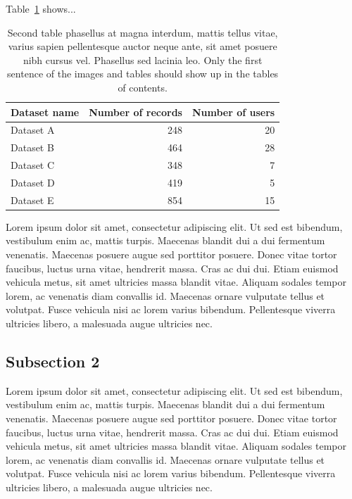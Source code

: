 Table~\ref{tab:table2} shows...


\begin{table}[ht]
\caption[Second table phasellus at magna interdum, mattis tellus vitae, varius sapien pellentesque auctor neque ante, sit amet posuere nibh cursus vel]
{Second table phasellus at magna interdum, mattis tellus vitae, varius sapien pellentesque auctor neque ante, sit amet posuere nibh cursus vel. Phasellus sed lacinia leo. Only the first sentence of the images and tables should show up in the tables of contents.}
\centering
\fontsize{10}{12}\selectfont
\begin{tabular}{|l|r|r|}
\hline
Dataset name & Number of records  & Number of users \\
\hline 
Dataset A & 248 & 20 \\
\hline
Dataset B & 464 & 28 \\
\hline
Dataset C & 348 & 7 \\
\hline
Dataset D & 419 & 5\\
\hline
Dataset E & 854 & 15\\
\hline
\end{tabular}
\label{tab:table2}
\end{table}


Lorem ipsum dolor sit amet, consectetur adipiscing elit. Ut sed est bibendum, vestibulum enim ac, mattis turpis. Maecenas blandit dui a dui fermentum venenatis. Maecenas posuere augue sed porttitor posuere. Donec vitae tortor faucibus, luctus urna vitae, hendrerit massa. Cras ac dui dui. Etiam euismod vehicula metus, sit amet ultricies massa blandit vitae. Aliquam sodales tempor lorem, ac venenatis diam convallis id. Maecenas ornare vulputate tellus et volutpat. Fusce vehicula nisi ac lorem varius bibendum. Pellentesque viverra ultricies libero, a malesuada augue ultricies nec.

\subsection*{Subsection 2} 

Lorem ipsum dolor sit amet, consectetur adipiscing elit. Ut sed est bibendum, vestibulum enim ac, mattis turpis. Maecenas blandit dui a dui fermentum venenatis. Maecenas posuere augue sed porttitor posuere. Donec vitae tortor faucibus, luctus urna vitae, hendrerit massa. Cras ac dui dui. Etiam euismod vehicula metus, sit amet ultricies massa blandit vitae. Aliquam sodales tempor lorem, ac venenatis diam convallis id. Maecenas ornare vulputate tellus et volutpat. Fusce vehicula nisi ac lorem varius bibendum. Pellentesque viverra ultricies libero, a malesuada augue ultricies nec.



